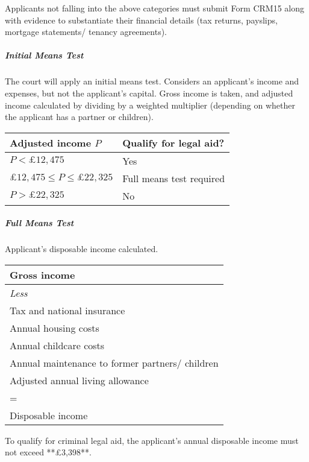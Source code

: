 \documentclass[
]{article}
\newenvironment{Shaded}{}{}
\newcommand{\NormalTok}[1]{#1}
\begin{document}
Applicants not falling into the above categories must submit Form CRM15
along with evidence to substantiate their financial details (tax
returns, payslips, mortgage statements/ tenancy agreements).

\hypertarget{initial-means-test}{%
\subparagraph{Initial Means Test}\label{initial-means-test}}

The court will apply an initial means test. Considers an applicant's
income and expenses, but not the applicant's capital. Gross income is
taken, and adjusted income calculated by dividing by a weighted
multiplier (depending on whether the applicant has a partner or
children).

\begin{longtable}[]{@{}ll@{}}
\toprule()
Adjusted income \(P\) & Qualify for legal aid? \\
\midrule()
\endhead
\(P < £12,475\) & Yes \\
\(£12,475 \leq P \leq £22,325\) & Full means test required \\
\(P > £22,325\) & No \\
\bottomrule()
\end{longtable}

\hypertarget{full-means-test}{%
\subparagraph{Full Means Test}\label{full-means-test}}

Applicant's disposable income calculated.

\begin{longtable}[]{@{}l@{}}
\toprule()
Gross income \\
\midrule()
\endhead
\emph{Less} \\
Tax and national insurance \\
Annual housing costs \\
Annual childcare costs \\
Annual maintenance to former partners/ children \\
Adjusted annual living allowance \\
= \\
Disposable income \\
\bottomrule()
\end{longtable}

\begin{Shaded}
\begin{Highlighting}[]
\NormalTok{To qualify for criminal legal aid, the applicant’s annual disposable income must not exceed **£3,398**.}
\end{Highlighting}
\end{Shaded}
\end{document}
